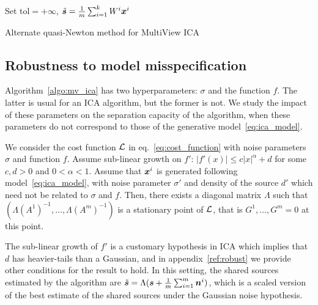 \begin{algorithm}[H]
\label{algo:mv_ica}
\SetAlgoLined
{}
Set tol$=+\infty$, $\tilde{\boldsymbol{s}} = \frac1m\sum_{i=1}^kW^i\boldsymbol{x}^i$\\
 \caption{Alternate quasi-Newton method for MultiView ICA}
\end{algorithm}
%
%
%
%
\subsection{Robustness to model misspecification}
Algorithm~\ref{algo:mv_ica} has two hyperparameters: $\sigma$ and the function $f$.
%
The latter is usual for an ICA algorithm, but the former is not.
%
We study the impact of these parameters on the separation capacity of the algorithm, when these parameters do not correspond to those of the generative model~\eqref{eq:ica_model}.
%
\begin{proposition}
\label{prop:robust}
We consider the cost function $\mathcal{L}$ in eq.~\eqref{eq:cost_function} with noise parameters $\sigma$ and function $f$.
%
Assume sub-linear growth on $f'$: $|f'(x)|\leq c|x|^{\alpha} + d$ for some $c, d > 0$ and $0<\alpha<1$.
%
Assume that $\boldsymbol{x}^i$ is generated following model~\eqref{eq:ica_model}, with noise parameter $\sigma'$ and density of the source $d'$ which need not be related to $\sigma$ and $f$.
%
Then, there exists a diagonal matrix $\Lambda$ such that $(\Lambda (A^1)^{-1}, \dots, \Lambda (A^m)^{-1})$ is a stationary point of $\mathcal{L}$, that is $G^1,\dots, G^m =0$ at this point.
\end{proposition}
%
The sub-linear growth of $f'$ is a customary hypothesis in ICA which implies that $d$ has heavier-tails than a Gaussian, and in appendix~\ref{ref:robust} we provide other conditions for the result to hold.
%
In this setting, the shared sources estimated by the algorithm are $\tilde{\boldsymbol{s}} = \Lambda (\boldsymbol{s} + \frac1m \sum_{i=1}^m \boldsymbol{n}^i)$, which is a scaled version of the best estimate of the shared sources under the Gaussian noise hypothesis.


